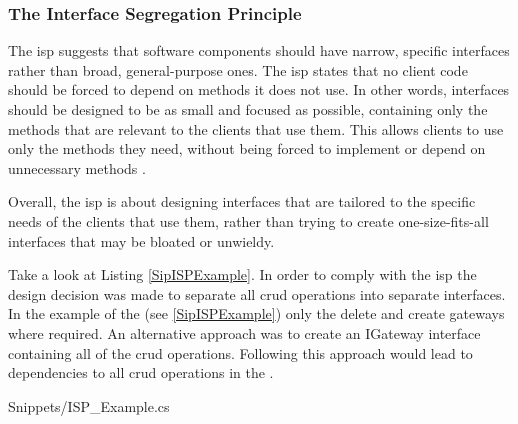 \subsubsection*{The Interface Segregation Principle} \label{subsubsec:isp}

The \gls{isp} suggests that software components should have narrow, specific interfaces
rather than broad, general-purpose ones. The \gls{isp} states that no client code should
be forced to depend on methods it does not use. In other words, interfaces should be
designed to be as small and focused as possible, containing only the methods that are
relevant to the clients that use them. This allows clients to use only the methods they
need, without being forced to implement or depend on unnecessary methods
\parencite[104]{robert_c_martin_clean_2018}.

Overall, the \gls{isp} is about designing interfaces that are tailored to the specific
needs of the clients that use them, rather than trying to create one-size-fits-all
interfaces that may be bloated or unwieldy.

Take a look at Listing \ref{SipISPExample}. In order to comply with the \gls{isp} the
design decision was made to separate all \gls{crud} operations into separate interfaces.
In the example of the  (see \ref{SipISPExample})
only the delete and create gateways where required. An alternative approach was to create
an IGateway interface containing all of the \gls{crud} operations. Following this approach
would lead to dependencies to all \gls{crud} operations in the
.


    {Snippets/ISP_Example.cs}